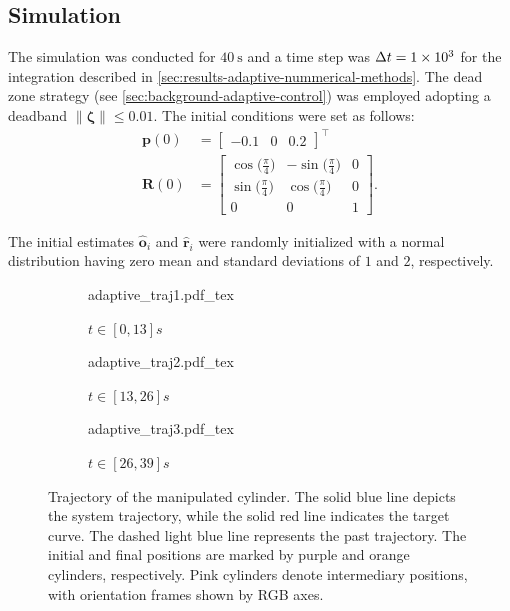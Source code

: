 \subsection{Simulation}
The simulation was conducted for $\qty{40}{\second}$ and a time step was $\Delta t=\num{1E3}$ for the integration described in \cref{sec:results-adaptive-nummerical-methods}. The dead zone strategy (see \cref{sec:background-adaptive-control}) was employed adopting a deadband $\|\boldsymbol{\zeta}\| \le 0.01$. The initial conditions were set as follows:
\begin{align}
    \mathbf{p}(0) &= \begin{bmatrix}
        -0.1 & 0 & 0.2
    \end{bmatrix}^\top\\
    \mathbf{R}(0) &= \begin{bmatrix}
        \cos\bigl(\frac{\pi}{4}\bigr) & -\sin\bigl(\frac{\pi}{4}\bigr) & 0\\
        \sin\bigl(\frac{\pi}{4}\bigr) & \cos\bigl(\frac{\pi}{4}\bigr) & 0\\
        0 & 0 & 1
    \end{bmatrix}.
\end{align}

The initial estimates $\widehat{\mathbf{o}}_i$ and $\widehat{\mathbf{r}}_i$ were randomly initialized with a normal distribution having zero mean and standard deviations of $1$ and $2$, respectively. 
\begin{figure}[ht]
    \centering
    \begin{subfigure}[b]{0.32\textwidth}
        \centering
        \def\svgwidth{\linewidth}
        {{adaptive_traj1.pdf_tex}}
        \caption{$t\in[0, 13]s$}
        \label{fig:adaptive-traj-first}
    \end{subfigure}
    \hfill
    \begin{subfigure}[b]{0.32\textwidth}
        \centering
        \def\svgwidth{\linewidth}
        {{adaptive_traj2.pdf_tex}}
        \caption{$t\in[13, 26]s$}
        \label{fig:adaptive-traj-second}
    \end{subfigure}
    \hfill
    \begin{subfigure}[b]{0.32\textwidth}
        \centering
        \def\svgwidth{\linewidth}
        {{adaptive_traj3.pdf_tex}}
        \caption{$t\in[26, 39]s$}
        \label{fig:adaptive-traj-third}
    \end{subfigure}
    \caption{Trajectory of the manipulated cylinder. The solid blue line depicts the system trajectory, while the solid red line indicates the target curve. The dashed light blue line represents the past trajectory. The initial and final positions are marked by purple and orange cylinders, respectively. Pink cylinders denote intermediary positions, with orientation frames shown by RGB axes.}
    \label{fig:adaptive-trajectory}
\end{figure}

